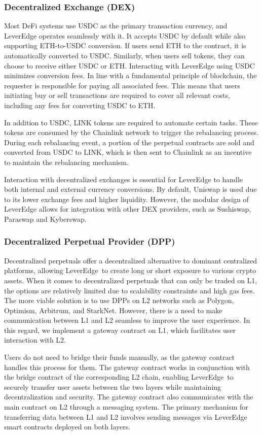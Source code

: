 \subsubsection{Decentralized Exchange (DEX)}
Most DeFi systems use USDC as the primary transaction currency, and LeverEdge operates seamlessly with it. It accepts USDC by default while also supporting ETH-to-USDC conversion. If users send ETH to the contract, it is automatically converted to USDC. Similarly, when users sell tokens, they can choose to receive either USDC or ETH. Interacting with LeverEdge using USDC minimizes conversion fees. In line with a fundamental principle of blockchain, the requester is responsible for paying all associated fees. This means that users initiating buy or sell transactions are required to cover all relevant costs, including any fees for converting USDC to ETH.

In addition to USDC, LINK tokens are required to automate certain tasks. These tokens are consumed by the Chainlink network to trigger the rebalancing process. During each rebalancing event, a portion of the perpetual contracts are sold and converted from USDC to LINK, which is then sent to Chainlink as an incentive to maintain the rebalancing mechanism. 

Interaction with decentralized exchanges is essential for LeverEdge to handle both internal and external currency conversions. By default, Uniswap is used due to its lower exchange fees and higher liquidity. However, the modular design of LeverEdge allows for integration with other DEX providers, such as Sushiswap, Paraswap and Kyberswap.

\subsubsection{Decentralized Perpetual Provider (DPP)}
Decentralized perpetuals offer a decentralized alternative to dominant centralized platforms, allowing LeverEdge\ to create long or short exposure to various crypto assets. When it comes to decentralized perpetuals that can only be traded on L1, the options are relatively limited due to scalability constraints and high gas fees. The more viable solution is to use DPPs on L2 networks such as Polygon, Optimism, Arbitrum, and StarkNet. However, there is a need to make communication between L1 and L2 seamless to improve the user experience. In this regard, we implement a gateway contract on L1, which facilitates user interaction with L2. 

Users do not need to bridge their funds manually, as the gateway contract handles this process for them. The gateway contract works in conjunction with the bridge contract of the corresponding L2 chain, enabling LeverEdge\ to securely transfer user assets between the two layers while maintaining decentralization and security. The gateway contract also communicates with the main contract on L2 through a messaging system. The primary mechanism for transferring data between L1 and L2 involves sending messages via LeverEdge smart contracts deployed on both layers.


